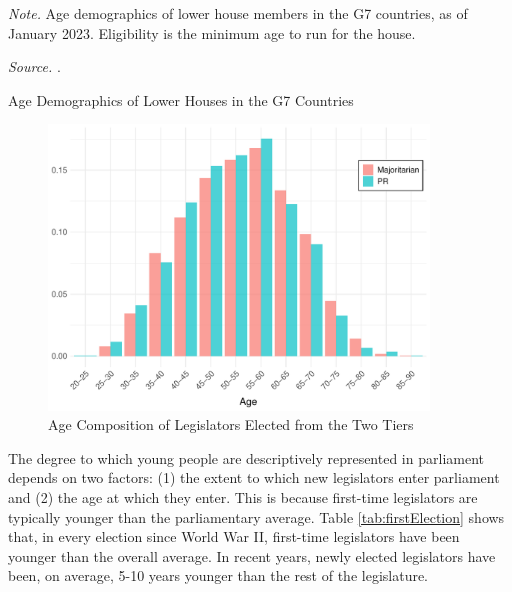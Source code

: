 \documentclass[a4paper, 11pt]{article}
\begin{document}
\begin{table}[htbp]
\begin{center}
\begin{threeparttable}

\begin{tablenotes}[flushleft]
  \scriptsize{
    \item{\textit{Note.} Age demographics of lower house members in the G7 countries, as of January 2023. Eligibility is the minimum age to run for the house.}
    \item{\textit{Source.} \citet{inter-parliamentaryunionDataAgeCountry2024}.}
  }
\end{tablenotes}
\end{threeparttable}
\caption{Age Demographics of Lower Houses in the G7 Countries}
\label{table:intl}
\end{center}
\end{table}

\begin{figure}[!htbp]
	\includegraphics[width = 0.9\textwidth]{../figure/paper/age_smd_vs_pr_winners.pdf}
	\caption{Age Composition of Legislators Elected from the Two Tiers}
	\label{fig:pr_vs_smd}
\end{figure}


The degree to which young people are descriptively represented in parliament depends on two factors: (1) the extent to which new legislators enter parliament and (2) the age at which they enter. This is because first-time legislators are typically younger than the parliamentary average. Table \ref{tab:firstElection} shows that, in every election since World War II, first-time legislators have been younger than the overall average. In recent years, newly elected legislators have been, on average, 5-10 years younger than the rest of the legislature.
\end{document}

